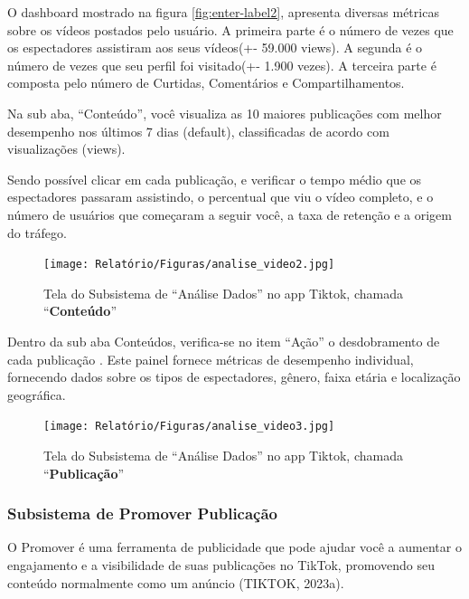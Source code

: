 O dashboard mostrado na figura \ref{fig:enter-label2}, apresenta diversas métricas sobre os vídeos postados pelo usuário. A primeira parte é o número de vezes que os espectadores assistiram aos seus vídeos(+- 59.000 views). A segunda é o número de vezes que seu perfil foi visitado(+- 1.900 vezes). A terceira parte é composta pelo número de Curtidas, Comentários e Compartilhamentos.

\newpage
Na sub aba, “Conteúdo”, você visualiza as 10 maiores publicações com melhor desempenho nos últimos 7 dias (default), classificadas de acordo com visualizações (views).\vskip0.3cm

Sendo possível clicar em cada publicação, e verificar o tempo médio que os espectadores passaram assistindo, o percentual que viu o vídeo completo, e o número de usuários que começaram a seguir você, a taxa de retenção e a origem do tráfego.



\begin{figure}[H]
    \centering
    \texttt{[image: Relatório/Figuras/analise\_video2.jpg]}
    \caption{Tela do Subsistema de “Análise Dados” no app Tiktok, chamada “\textbf{Conteúdo}”}
    \label{fig:enter-label} 
\end{figure}

Dentro da sub aba Conteúdos, verifica-se no item “Ação” o desdobramento de cada publicação . Este painel fornece métricas de desempenho individual, fornecendo dados sobre os tipos de espectadores, gênero, faixa etária e localização geográfica.

\begin{figure}[H]
    \centering
    \texttt{[image: Relatório/Figuras/analise\_video3.jpg]}
    \caption{Tela do Subsistema de “Análise Dados” no app Tiktok, chamada “\textbf{Publicação}”}
    \label{fig:enter-label} 
\end{figure}





\newpage
\subsubsection{Subsistema de Promover Publicação}

O Promover é uma ferramenta de publicidade que pode ajudar você a aumentar o engajamento e a visibilidade de suas publicações no TikTok, promovendo seu conteúdo normalmente como um anúncio (TIKTOK, 2023a).



